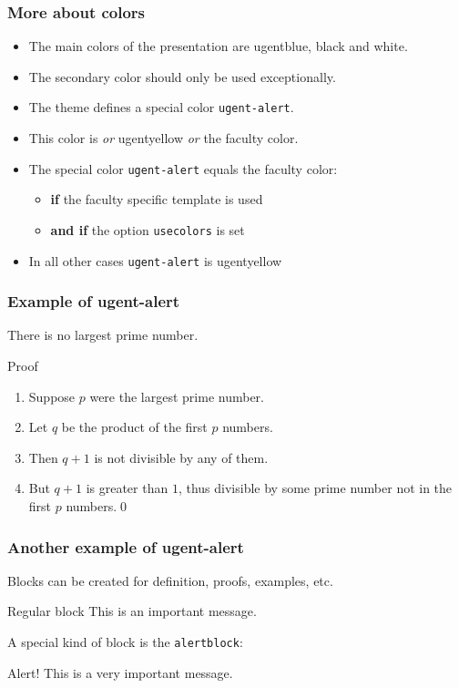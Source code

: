 \documentclass[aspectratio=169]{beamer}
\begin{document}
\begin{frame}
    \frametitle{More about colors}
    \begin{itemize}
        \itemsep.25cm
        \item The main colors of the presentation are ugentblue, black and white.
        \item The secondary color should only be used exceptionally.
        \item The theme defines a special color \texttt{ugent-alert}.
        \item This color is \emph{or} {\color{ugentyellow}ugentyellow} \emph{or} the faculty color.
        \item The special color \texttt{ugent-alert} equals the faculty color:
            \begin{itemize}
                \item \textbf{if} the faculty specific template is used
                \item \textbf{and if} the option \texttt{usecolors} is set 
            \end{itemize}
        \item In all other cases \texttt{ugent-alert} is {\color{ugentyellow}ugentyellow}
    \end{itemize}
\end{frame}

\begin{frame}
    \frametitle{Example of ugent-alert}
    \begin{theorem}
        There is no largest prime number.
    \end{theorem} 
    \pause
    \begin{block}{Proof}
        \begin{enumerate} 
            \item<2-| alert@2> Suppose $p$ were the largest prime number. 
            \item<3-| alert@3> Let $q$ be the product of the first $p$ numbers. 
            \item<4-| alert@4> Then $q+1$ is not divisible by any of them. 
            \item<5-6| alert@5> But $q + 1$ is greater than $1$, thus divisible by some prime number not in the first $p$ numbers.\qed
        \end{enumerate}
    \end{block}
\end{frame}

\begin{frame}
    \frametitle{Another example of ugent-alert}
    Blocks can be created for definition, proofs, examples, etc.
    \begin{block}{Regular block}
        This is an important message.
    \end{block}
    \vspace{.5cm}
    \pause
    A special kind of block is the \texttt{alertblock}:
    \begin{alertblock}{Alert!}
        This is a very important message.
    \end{alertblock}
\end{frame}
\end{document}

